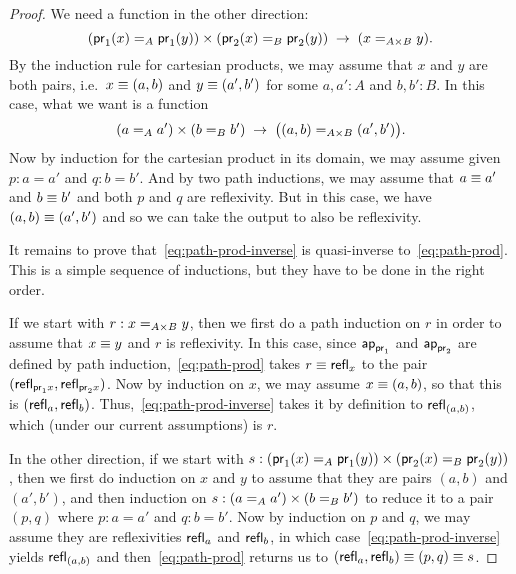 \begin{proof}
  We need a function in the other direction:
  \begin{equation}
    (\id[A]{\proj1(x)}{\proj1(y)}) \times (\id[B]{\proj2(x)}{\proj2(y)}) \;\to\; (\id[A\times B]{x}{y}) .\label{eq:path-prod-inverse}
  \end{equation}
  By the induction rule for cartesian products, we may assume that $x$ and $y$ are both pairs, i.e.\ $x\jdeq (a,b)$ and $y\jdeq (a',b')$ for some $a,a':A$ and $b,b':B$.
  In this case, what we want is a function
  \begin{equation*}
    (\id[A]{a}{a'}) \times (\id[B]{b}{b'}) \;\to\; \big(\id[A\times B]{(a,b)}{(a',b')}\big).
  \end{equation*}
  Now by induction for the cartesian product in its domain, we may assume given $p:a=a'$ and $q:b=b'$.
  And by two path inductions, we may assume that $a\jdeq a'$ and $b\jdeq b'$ and both $p$ and $q$ are reflexivity.
  But in this case, we have $(a,b)\jdeq(a',b')$ and so we can take the output to also be reflexivity.

  It remains to prove that~\eqref{eq:path-prod-inverse} is quasi-inverse to~\eqref{eq:path-prod}.
  This is a simple sequence of inductions, but they have to be done in the right order.

  If we start with $r:\id[A\times B]{x}{y}$, then we first do a path induction on $r$ in order to assume that $x\jdeq y$ and $r$ is reflexivity.
  In this case, since $\apfunc{\proj1}$ and $\apfunc{\proj2}$ are defined by path induction,~\eqref{eq:path-prod} takes $r\jdeq \refl{x}$ to the pair $(\refl{\proj1x},\refl{\proj2x})$.
  Now by induction on $x$, we may assume $x\jdeq (a,b)$, so that this is $(\refl a, \refl b)$.
  Thus,~\eqref{eq:path-prod-inverse} takes it by definition to $\refl{(a,b)}$, which (under our current assumptions) is $r$.
  
  In the other direction, if we start with $s:(\id[A]{\proj1(x)}{\proj1(y)}) \times (\id[B]{\proj2(x)}{\proj2(y)})$, then we first do induction on $x$ and $y$ to assume that they are pairs $(a,b)$ and $(a',b')$, and then induction on $s:(\id[A]{a}{a'}) \times (\id[B]{b}{b'})$ to reduce it to a pair $(p,q)$ where $p:a=a'$ and $q:b=b'$.
  Now by induction on $p$ and $q$, we may assume they are reflexivities $\refl a$ and $\refl b$, in which case~\eqref{eq:path-prod-inverse} yields $\refl{(a,b)}$ and then~\eqref{eq:path-prod} returns us to $(\refl a,\refl b)\jdeq (p,q)\jdeq s$.
\end{proof}


